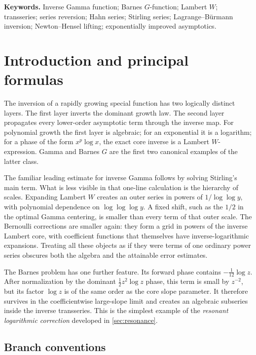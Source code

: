 \documentclass[11pt,oneside]{article}
\theoremstyle{plain}
\theoremstyle{definition}
\theoremstyle{remark}
\begin{document}
\noindent\textbf{Keywords.}
Inverse Gamma function; Barnes \(G\)-function; Lambert \(W\); transseries;
series reversion; Hahn series; Stirling series; Lagrange--B\"urmann inversion;
Newton--Hensel lifting; exponentially improved asymptotics.

{\small\tableofcontents}
\clearpage

\section{Introduction and principal formulas}
\label{sec:introduction}

The inversion of a rapidly growing special function has two logically distinct
layers.  The first layer inverts the dominant growth law.  The second layer
propagates every lower-order asymptotic term through the inverse map.  For
polynomial growth the first layer is algebraic; for an exponential it is a
logarithm; for a phase of the form \(x^p\log x\), the exact core inverse is a
Lambert \(W\)-expression.  Gamma and Barnes \(G\) are the first two canonical
examples of the latter class.

The familiar leading estimate for inverse Gamma follows by solving Stirling's
main term.  What is less visible in that one-line calculation is the hierarchy
of scales.  Expanding Lambert \(W\) creates an outer series in powers of
\(1/\log\log y\), with polynomial dependence on \(\log\log\log y\).  A fixed
shift, such as the \(1/2\) in the optimal Gamma centering, is smaller than every
term of that outer scale.  The Bernoulli corrections are smaller again: they
form a grid in powers of the inverse Lambert core, with coefficient functions
that themselves have inverse-logarithmic expansions.  Treating all these
objects as if they were terms of one ordinary power series obscures both the
algebra and the attainable error estimates.

The Barnes problem has one further feature.  Its forward phase contains
\(-\tfrac1{12}\log z\).  After normalization by the dominant
\(\tfrac12z^2\log z\) phase, this term is small by \(z^{-2}\), but its factor
\(\log z\) is of the same order as the core slope parameter.  It therefore
survives in the coefficientwise large-slope limit and creates an algebraic
subseries inside the inverse transseries.  This is the simplest example of the
\emph{resonant logarithmic correction} developed in \cref{sec:resonance}.

\subsection{Branch conventions}
\end{document}
